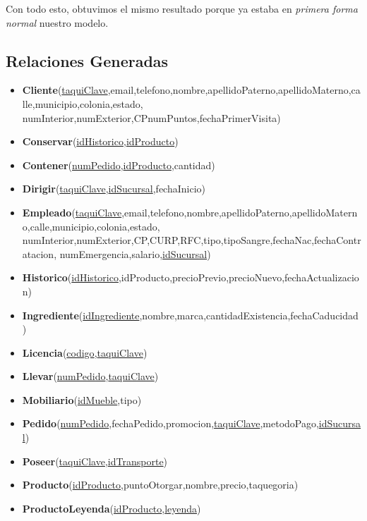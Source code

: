 \documentclass[11pt,letterpaper]{article}
\begin{document}
Con todo esto, obtuvimos el mismo resultado porque ya estaba en \textit{primera forma normal} nuestro modelo.

\subsection{Relaciones Generadas}
\begin{itemize}
\item \footnotesize{\textbf{Cliente}(\underline{taquiClave},email,telefono,nombre,apellidoPaterno,apellidoMaterno,calle,municipio,colonia,estado,
numInterior,numExterior,CPnumPuntos,fechaPrimerVisita)}
\item \footnotesize{\textbf{Conservar}(\underline{idHistorico},\underline{idProducto})}
\item \footnotesize{\textbf{Contener}(\underline{numPedido},\underline{idProducto},cantidad)}
\item \footnotesize{\textbf{Dirigir}(\underline{taquiClave},\underline{idSucursal},fechaInicio)}
\item \footnotesize{\textbf{Empleado}(\underline{taquiClave},email,telefono,nombre,apellidoPaterno,apellidoMaterno,calle,municipio,colonia,estado,
numInterior,numExterior,CP,CURP,RFC,tipo,tipoSangre,fechaNac,fechaContratacion,
numEmergencia,salario,\underline{idSucursal})}
\item \footnotesize{\textbf{Historico}(\underline{idHistorico},idProducto,precioPrevio,precioNuevo,fechaActualizacion)}
\item \footnotesize{\textbf{Ingrediente}(\underline{idIngrediente},nombre,marca,cantidadExistencia,fechaCaducidad)}
\item \footnotesize{\textbf{Licencia}(\underline{codigo},\underline{taquiClave}})
\item \footnotesize{\textbf{Llevar}(\underline{numPedido},\underline{taquiClave})}
\item \footnotesize{\textbf{Mobiliario}(\underline{idMueble},tipo)}
\item \footnotesize{\textbf{Pedido}(\underline{numPedido},fechaPedido,promocion,\underline{taquiClave},metodoPago,\underline{idSucursal})}
\item \footnotesize{\textbf{Poseer}(\underline{taquiClave},\underline{idTransporte})}
\item \footnotesize{\textbf{Producto}(\underline{idProducto},puntoOtorgar,nombre,precio,taquegoria)}
\item \footnotesize{\textbf{ProductoLeyenda}(\underline{idProducto},\underline{leyenda})}

\end{itemize}
\end{document}
